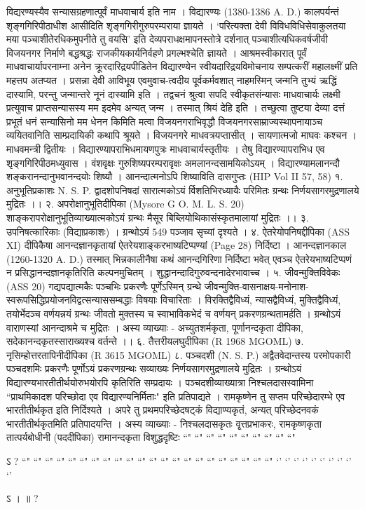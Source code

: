 विद्यरण्यस्यैव सन्यासग्रहणात्पूर्वं माधवाचार्य इति नाम । विद्यारण्यः (1380-1386 A. D.) कालपर्यन्तं शृङ्गगिरिपीठाधीश आसीदिति शृङ्गगिरीगुरुपरम्पराया ज्ञायते । `परित्यक्ता देवी विविधविधिसेवाकुलतया मया पञ्चाशीतेरधिकमुपनीते तु वयसि' इति देव्यपराधक्षमापनस्तोत्रे दर्शनात् पञ्चाशीत्यधिकवर्षजीवी विजयनगर निर्माणे बद्धश्रद्धः राजकीयकार्यनिर्वहणे प्रगल्भश्चेति ज्ञायते । आश्रमस्वीकारात् पूर्वं माधवाचार्यापरनाम्ना अनेन क्रूरदारिद्रयपीडितेन विद्यारण्येन स्वीयदारिद्रयविमोचनाय सम्पत्करीं महालक्ष्मीं प्रति महत्तप अतप्यत । प्रसन्ना देवी आविभूय एवमुवाच-त्वदीय पूर्वकर्मवशात् नाहमस्मिन् जन्मनि तुभ्यं ऋद्धिं दास्यामि, परन्तु जन्मान्तरे नूनं दास्यामि इति । तद्वचनं श्रुत्वा सपदि स्वीकृतसंन्यासः माधवाचार्यः लक्ष्मी प्रत्युवाच प्राप्तसन्यासस्य मम इदमेव अन्यत् जन्म । तस्मात् श्रियं देहि इति । तच्छुत्वा तुष्टया देव्या दत्तं प्रभूतं धनं सन्यासिनो मम धेनन किमिति मत्वा विजयनगराभिवृद्धौ विजयनगरसाम्राज्यस्थापनायाञ्च व्ययितवानिति साम्प्रदायिकी कथापि श्रूयते ।
विजयनगरे माधवत्रयप्तासीत् । सायणात्मजो माघवः कश्चन । माधवमन्त्री द्वितीयः । विद्यारण्यापराभिधमायणपुत्रः माधवाचार्यस्तृतीयः । तेषु विद्यारण्यापराभिध एव शृङ्गगिरिपीठमध्युवास ।
वंशवृक्षः
गुरुशिष्यपरम्परावृक्षः
अमलानन्दसामयिकोऽयम् । विद्यारण्यामलानन्दौ शङ्करानन्दानुभवानन्दयोः शिष्यौ । आनन्दात्मनोऽपि शिष्याविति दासगुप्तः (HIP Vol II 57, 58)
१. अनुभूतिप्रकाशः N. S. P.
द्वादशोपनिषदां सारात्मकोऽयं र्विशतिभिरध्यायैः परिमितः ग्रन्थः निर्णयसागरमुद्रणालये मुद्रितः ।।
२. अपरोक्षानुभूतिदीपिका (Mysore G O. M. L. S. 20)
शाङ्करापरोक्षानुभूतिव्याख्यात्मकोऽयं ग्रन्थः मैसूर बिब्लियोथिकासंस्कृतमालायां मुद्रितः ।।
३. उपनिषत्कारिकाः (विद्याप्रकाशः) ।
ग्रन्थोऽयं 549 पञ्जाव सृच्यां दृश्यते ।
४. ऐतरेयोपनिषद्दीपिका (ASS XI)
दीपिकैषा आनन्दज्ञानकृतायां ऐतरेयशाङ्करभाष्यटिप्पण्यां (Page 28) निर्दिष्टा । आनन्दज्ञानकाल (1260-1320 A. D.) तस्मात् भिन्नकालीनैषा कथं आनन्दगिरिणा निर्दिष्टा भवेत् एवञ्च ऐतरेयभाष्यटिप्पणं न प्रसिद्धानन्दज्ञानकृतिरिति कल्पनमुचितम् । शुद्धानन्दादिगुरुवन्दनादेरभावाच्च ।
५. जीवन्मुक्तिविवेकः (ASS 20)
गद्यपद्यात्मकैः पञ्चभिः प्रकरणैः पूर्णेऽस्मिन् ग्रन्थे जीवन्मुक्ति-वासनाक्षय-मनोनाश-स्वरूपसिद्धिप्रयोजनविद्वत्सन्याससम्बद्धाः विषयाः विचारिताः । विरक्तिद्वैविध्यं, न्यासद्वैविध्यं, मुक्तिद्वैविध्यं, तयोर्भेदञ्च वर्णयन्नयं ग्रन्थः जीवतो मुक्तस्य च स्वाभाविकभेदं च वर्णयन् प्रकरणग्रन्थतामर्हति । ग्रन्थोऽयं वाराणस्यां आनन्दाश्रमे च मुद्रितः । अस्य व्याख्याः - अच्युतशर्मकृता, पूर्णानन्दकृता दीपिका, सदेकानन्दकृतस्साराख्यश्च वर्तन्ते ।।
६. तैत्तरीयलघुदीपिका (R 1968 MGOML)
७. नृसिम्होत्तरतापिनीदीपिका (R 3615 MGOML)
८. पञ्चदशी (N. S. P.)
अद्वैतवेदान्तस्य परमोपकारी पञ्चदशमिः प्रकरणैः पूर्णोऽयं प्रकरणग्रन्थः सव्याख्यः निर्णयसागरमुद्रणालये मुद्रितः । ग्रन्थोऽयं विद्यारण्यभारतीतीर्थयोरुभयोरपि कृतिरिति सम्प्रदायः । पञ्चदशीव्याख्यात्रा निश्चलदासस्वामिना ``प्राथमिकादश परिच्छोदा एव विद्यारण्यनिर्मिताः" इति प्रतिपाद्यते । रामकृष्णेन तु सप्तम परिच्छेदारम्भे एव भारतीतीर्थकृत इति निर्दिश्यते । अपरे तु प्रथमपरिच्छेदषट्कं विद्याण्यकृतं, अन्यत् परिच्छेदनवकं भारतीतीर्थकृतमिति प्रतिपादयन्ति । अस्य व्याख्याः - निश्चलदासकृतः वृ्त्तप्रभाकरः, रामकृष्णकृता तात्पर्यबोधीनी (पददीपिका) रामानन्दकृता विशुद्धदृष्टिः ``" ``" ``" ``" ``" ``" ``" ``" ``" ``" 

ऽ  ?
``" ``" ``" ``" ``" ``" ``" ``" ``" ``" ``" ``" ``" ``" ``" ``" ``" ``" ``" ``" ``" ``"
`' `' `' `' `' `' `' `' `' `' 

ऽ  ।   ॥ ?
